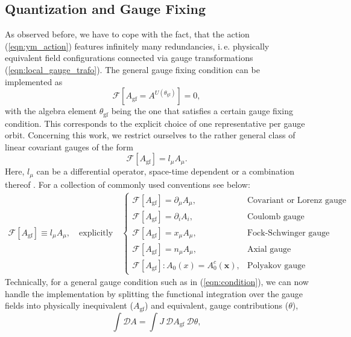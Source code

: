 \subsection{Quantization and Gauge Fixing}
As observed before, we have to cope with the fact, that the action (\ref{eqn:ym_action}) features infinitely many redundancies, i.\,e.  physically equivalent field configurations connected via gauge transformations (\ref{eqn:local_gauge_trafo}). 
The general gauge fixing condition can be implemented as
\begin{equation}
\mathcal{F}[A_{\mathrm{gf}} = A^{U(\theta_{\mathrm{gf}})}]=0, \label{eqn:condition}
\end{equation}
with the algebra element $\theta_{\mathrm{gf}}$ being the one that satisfies a certain gauge fixing condition. This corresponds to the explicit choice of one representative per gauge orbit. Concerning this work, we restrict ourselves to the rather general class of linear covariant gauges of the form
\begin{equation}
	\mathcal{F}[A_{\mathrm{gf}}]=l_{\mu}A_{\mu}.
\end{equation}
Here, $l_{\mu}$ can be a differential operator, space-time dependent or a combination thereof \cite{Wink2020}. For a collection of commonly used conventions see below:
\begin{align}
	\mathcal{F}[A_{\mathrm{gf}}]\equiv l_{\mu}A_{\mu},\quad \text{explicitly}\quad \left\{\begin{array}{ll}{\mathcal{F}[A_{\mathrm{gf}}] = \partial_{\mu}A_{\mu},} & {\text{Covariant or Lorenz gauge}} \\ {\mathcal{F}[A_{\mathrm{gf}}] = \partial_iA_i,} & {\text {Coulomb gauge}} \\ {\mathcal{F}[A_{\mathrm{gf}}] = x_{\mu}A_{\mu},} & {\text{Fock-Schwinger gauge}} \\ {\mathcal{F}[A_{\mathrm{gf}}] = n_{\mu}A_{\mu},} & {\text{Axial gauge}} \\ {\mathcal{F}[A_{\mathrm{gf}}]: A_0(x) = A_0^c(\mathbf{x}),} & {\text{Polyakov gauge}}\end{array}\right.
\label{eqn:regulator_limits}
\end{align}
Technically, for a general gauge condition such as in (\ref{eqn:condition}), we can now handle the implementation by splitting the functional integration over the gauge fields into physically inequivalent ($A_{\mathrm{gf}}$) and equivalent, gauge contributions ($\theta$),  
\begin{equation}
\int\mathcal{D} A = \int J\ \mathcal{D}A_{\mathrm{gf}}\ \mathcal{D}\theta, \label{eqn:measure}
\end{equation}
